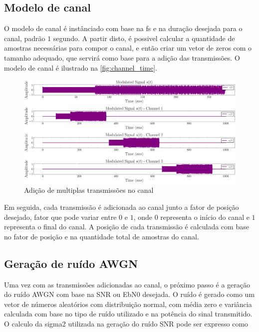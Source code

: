 \subsection{Modelo de canal}\label{sec:modelo_canal}

O modelo de canal é instânciado com base na \gls{fs} e na duração desejada para o canal, padrão $1$ segundo. A partir disto, é possivel calcular a quantidade de amostras necessárias para compor o canal, e então criar um vetor de zeros com o tamanho adequado, que servirá como base para a adição das transmissões. O modelo de canal é ilustrado na \autoref{fig:channel_time}.

\begin{figure}[H]
	\centering
	\caption{Adição de multiplas transmissões no canal}\label{fig:channel_time}
	\includegraphics[width=\linewidth]{assets/cap3/example_channel_time_subchannels.pdf}
\end{figure}

Em seguida, cada transmissão é adicionada ao canal junto a fator de posição desejado, fator que pode variar entre $0$ e $1$, onde $0$ representa o início do canal e $1$ representa o final do canal. A posição de cada transmissão é calculada com base no fator de posição e na quantidade total de amostras do canal. 

\subsection{Geração de ruído AWGN}\label{sec:geracao_ruido}

Uma vez com as transmissões adicionadas ao canal, o próximo passo é a geração do ruído \gls{AWGN} com base na \gls{SNR} ou \gls{EbN0} desejada. O ruído é gerado como um vetor de números aleatórios com distribuição normal, com média zero e variância calculada com base no tipo de ruído utilizado e na potência do sinal transmitido. O calculo da \gls{sigma2} utilizada na geração do ruído \gls{SNR} pode ser expresso como

